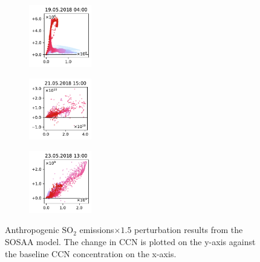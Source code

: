\begin{figure}[H]
    \begin{subfigure}
        \centering
        \includegraphics[width=0.30\textwidth,valign=t]{evaluation/figures/perturbations/perturbation-19.05.2018:04.00-so2-mul-1.5.pdf}
    \end{subfigure}
    \begin{subfigure}
        \centering
        \includegraphics[width=0.30\textwidth,valign=t]{evaluation/figures/perturbations/perturbation-21.05.2018:15.00-so2-mul-1.5.pdf}
    \end{subfigure}
    \begin{subfigure}
        \centering
        \includegraphics[width=0.30\textwidth,valign=t]{evaluation/figures/perturbations/perturbation-23.05.2018:13.00-so2-mul-1.5.pdf}
    \end{subfigure}

    \caption[$\text{SO}_2$ emissions$\times 1.5$ perturbation SOSAA results]{Anthropogenic $\text{SO}_2$ emissions$\times 1.5$ perturbation results from the SOSAA model. The change in CCN is plotted on the y-axis against the baseline CCN concentration on the x-axis.}
    \label{fig:sosaa-perturbation-so2-mul-1.5}
\end{figure}

